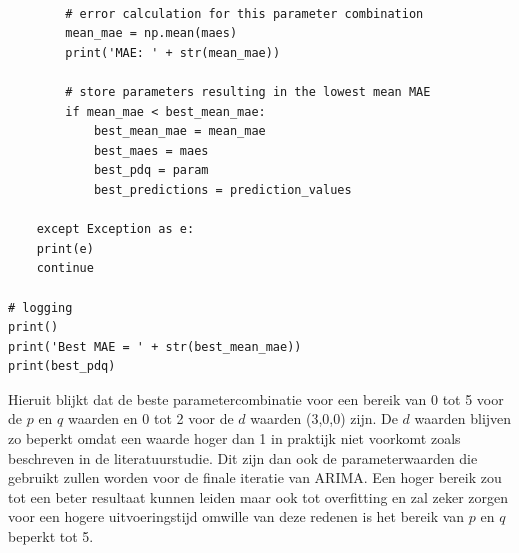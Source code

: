 \begin{verbatim}
        
        # error calculation for this parameter combination
        mean_mae = np.mean(maes)
        print('MAE: ' + str(mean_mae))    
        
        # store parameters resulting in the lowest mean MAE
        if mean_mae < best_mean_mae:
            best_mean_mae = mean_mae
            best_maes = maes
            best_pdq = param
            best_predictions = prediction_values
            
    except Exception as e:
    print(e)
    continue

# logging
print()
print('Best MAE = ' + str(best_mean_mae))
print(best_pdq)
\end{verbatim}

Hieruit blijkt dat de beste parametercombinatie voor een bereik van 0 tot 5 voor de $p$ en $q$ waarden en 0 tot 2 voor de $d$ waarden (3,0,0) zijn. De $d$ waarden blijven zo beperkt omdat een waarde hoger dan 1 in praktijk niet voorkomt zoals beschreven in de literatuurstudie. Dit zijn dan ook de parameterwaarden die gebruikt zullen worden voor de finale iteratie van ARIMA. Een hoger bereik zou tot een beter resultaat kunnen leiden maar ook tot overfitting en zal zeker zorgen voor een hogere uitvoeringstijd omwille van deze redenen is het bereik van $p$ en $q$ beperkt tot 5.

